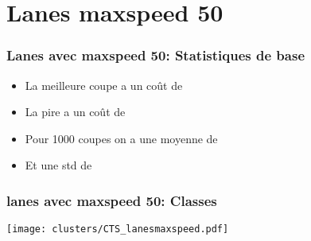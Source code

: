 \documentclass[aspectratio=169]{beamer}
\begin{document}
    \section{Lanes maxspeed 50}
    \begin{frame}
        \frametitle{Lanes avec maxspeed 50: Statistiques de base}
    
        \begin{itemize}
            \item La meilleure coupe a un coût de 
            \item La pire a un coût de 
            \item Pour 1000 coupes on a une moyenne de 
            \item Et une std de 
        \end{itemize}
        
    \end{frame}
    \begin{frame}
        \frametitle{lanes avec maxspeed 50: Classes}
        \centering
        \texttt{[image: clusters/CTS\_lanesmaxspeed.pdf]}
    \end{frame}
\end{document}
